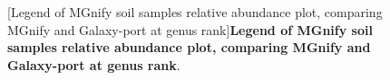 \begin{figure}[H]
  \centering
  [Legend of MGnify soil samples relative abundance plot, comparing MGnify and Galaxy-port at genus rank]{\textbf{Legend of MGnify soil samples relative abundance plot, comparing MGnify and Galaxy-port at genus rank}.} \label{fig:soil_abundance_level_g_mgnifyVSgalaxy_legend.png}%
\end{figure}

